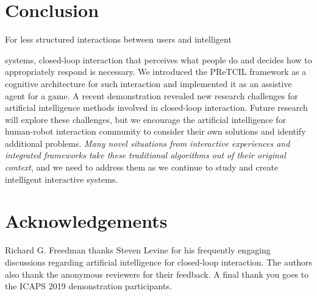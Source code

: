 \documentclass[letterpaper]{article} %
\begin{document}

\section{Conclusion\label{sec:conclusion}}
For less structured interactions between users and intelligent

\noindent systems, closed-loop interaction that perceives what people do and decides how to appropriately respond is necessary.  We introduced the {\sc PReTCIL} framework as a cognitive architecture for such interaction and implemented it as an assistive agent for a game.  A recent demonstration %
 revealed new research challenges for artificial intelligence methods involved in closed-loop interaction. %
 Future research will explore these challenges, but we encourage the artificial intelligence for human-robot interaction community to consider their own solutions and identify additional problems.  \textit{Many novel situations from interactive experiences and integrated frameworks take these traditional algorithms out of their original context}, and we need to address them as we continue to study and create intelligent interactive systems.
 
 \section*{Acknowledgements} Richard G. Freedman thanks Steven Levine for his frequently engaging discussions regarding artificial intelligence for closed-loop interaction.  The authors also thank the anonymous reviewers for their feedback.  A final thank you goes to the ICAPS 2019 demonstration participants. \newpage %



\end{document}
